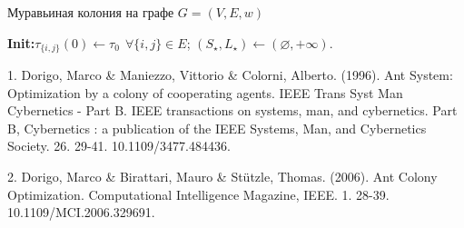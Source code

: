 \documentclass{article}
\newcommand{\1}{\mathds{1}}
\begin{document}
\begin{algorithm}[H]
\caption{Муравьиная колония на графе $G=(V,E,w)$}
\KwIn{$\alpha,\beta\ge 0$;\ $\rho\in(0,1]$;\ $Q>0$;\ $m,T\in\mathbb{N}$;\ $\tau_0>0$}
\textbf{Init:}\quad $\tau_{\{i,j\}}(0)\gets \tau_{0} \ \ \forall \{i,j\}\in E$; $(S_\star,L_\star)\gets(\varnothing,+\infty)$.

\end{algorithm}

1. Dorigo, Marco & Maniezzo, Vittorio & Colorni, Alberto. (1996). Ant System: Optimization by a colony of cooperating agents. IEEE Trans Syst Man Cybernetics - Part B. IEEE transactions on systems, man, and cybernetics. Part B, Cybernetics : a publication of the IEEE Systems, Man, and Cybernetics Society. 26. 29-41. 10.1109/3477.484436. 

2. Dorigo, Marco & Birattari, Mauro & Stützle, Thomas. (2006). Ant Colony Optimization. Computational Intelligence Magazine, IEEE. 1. 28-39. 10.1109/MCI.2006.329691.
\end{document}
